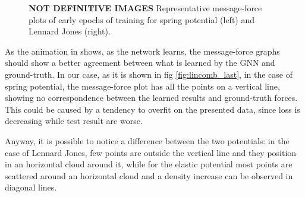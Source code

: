 \documentclass[../../master_thesis_np.tex]{subfiles}
\begin{document}
\begin{figure}[tp]
	\centering
	\caption{\textbf{NOT DEFINITIVE IMAGES} Representative message-force plots of early epochs of training for spring potential (left) and Lennard Jones (right).}
	\label{fig:lincomb}
\end{figure}

As the animation in \cite{cranmer_discovering_2020} shows, as the network learns, the message-force graphs should show a better agreement between what is learned by the GNN and ground-truth.
In our case, as it is shown in fig \ref{fig:lincomb_last}, in the case of spring potential, the message-force plot has all the points on a vertical line, showing no correspondence between the learned results and ground-truth forces.
This could be caused by a tendency to overfit on the presented data, since loss is decreasing while test result are worse.

Anyway, it is possible to notice a difference between the two potentials: in the case of Lennard Jones, few points are outside the vertical line and they position in an horizontal cloud around it, while for the elastic potential most points are scattered around an horizontal cloud and a density increase can be observed in diagonal lines.
\end{document}
